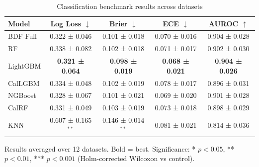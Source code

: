 \begin{table}[htbp]
\centering
\caption{Classification benchmark results across datasets}
\label{tab:classification-main}
\begin{tabular}{lcccc}
\toprule
Model & Log Loss $\downarrow$ & Brier $\downarrow$ & ECE $\downarrow$ & AUROC $\uparrow$ \\
\midrule
BDF-Full & 0.322 ± 0.046 & 0.101 ± 0.018 & 0.070 ± 0.016 & 0.904 ± 0.028 \\
RF & 0.338 ± 0.082 & 0.102 ± 0.018 & 0.071 ± 0.017 & 0.902 ± 0.030 \\
LightGBM & \textbf{0.321 ± 0.064} & \textbf{0.098 ± 0.019} & \textbf{0.068 ± 0.021} & \textbf{0.904 ± 0.026} \\
CalLGBM & 0.334 ± 0.048 & 0.102 ± 0.019 & 0.078 ± 0.017 & 0.896 ± 0.031 \\
NGBoost & 0.328 ± 0.067 & 0.101 ± 0.021 & 0.069 ± 0.020 & 0.901 ± 0.028 \\
CalRF & 0.331 ± 0.049 & 0.103 ± 0.019 & 0.073 ± 0.018 & 0.898 ± 0.029 \\
KNN & 0.607 ± 0.165$^{**}$ & 0.146 ± 0.014$^{**}$ & 0.081 ± 0.021 & 0.814 ± 0.036 \\
\bottomrule
\end{tabular}
\par\smallskip\footnotesize{Results averaged over 12 datasets. Bold = best. Significance: * $p<0.05$, ** $p<0.01$, *** $p<0.001$ (Holm-corrected Wilcoxon vs control).}
\end{table}
